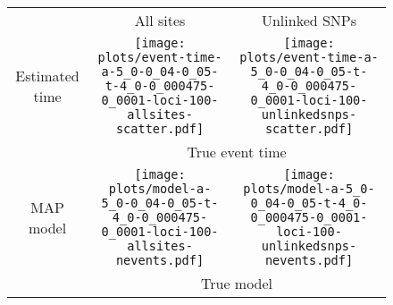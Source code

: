 \documentclass[border=10pt,varwidth=30cm]{standalone}
\begin{document}
\begin{figure}
    \centering
    \begin{tabular}{@{}ccc@{}}
        & \multirow{1}{0.15\textwidth}{\LARGE\centering All sites}
        & \multirow{1}{0.15\textwidth}{\LARGE\centering Unlinked SNPs} \\[2.5ex]
        \multirow{1}{*}[8em]{\begin{sideways}\large Estimated time\end{sideways}}
        & \texttt{[image: plots/event-time-a-5\_0-0\_04-0\_05-t-4\_0-0\_000475-0\_0001-loci-100-allsites-scatter.pdf]}
        & \texttt{[image: plots/event-time-a-5\_0-0\_04-0\_05-t-4\_0-0\_000475-0\_0001-loci-100-unlinkedsnps-scatter.pdf]} \\
        & \multicolumn{2}{c}{\large True event time} \\
        \multirow{1}{*}[7.5em]{\begin{sideways}\large MAP model\end{sideways}}
        & \texttt{[image: plots/model-a-5\_0-0\_04-0\_05-t-4\_0-0\_000475-0\_0001-loci-100-allsites-nevents.pdf]}
        & \texttt{[image: plots/model-a-5\_0-0\_04-0\_05-t-4\_0-0\_000475-0\_0001-loci-100-unlinkedsnps-nevents.pdf]} \\
        & \multicolumn{2}{c}{\large True model} \\
    \end{tabular}
\end{figure}
\end{document}
